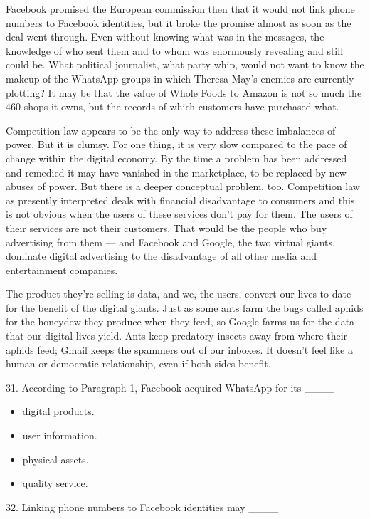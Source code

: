 \documentclass[UTF8,11pt]{ctexart}
\begin{document}
Facebook promised the European commission then that it would not link phone numbers to Facebook identities, but it broke the promise almost as soon as the deal went through. Even without knowing what was in the messages, the knowledge of who sent them and to whom was enormously revealing and still could be. What political journalist, what party whip, would not want to know the makeup of the WhatsApp groups in which Theresa May’s enemies are currently plotting? It may be that the value of Whole Foods to Amazon is not so much the 460 shops it owns, but the records of which customers have purchased what.


Competition law appears to be the only way to address these imbalances of power. But it is clumsy. For one thing, it is very slow compared to the pace of change within the digital economy. By the time a problem has been addressed and remedied it may have vanished in the marketplace, to be replaced by new abuses of power. But there is a deeper conceptual problem, too. Competition law as presently interpreted deals with financial disadvantage to consumers and this is not obvious when the users of these services don’t pay for them. The users of their services are not their customers. That would be the people who buy advertising from them — and Facebook and Google, the two virtual giants, dominate digital advertising to the disadvantage of all other media and entertainment companies.


The product they’re selling is data, and we, the users, convert our lives to date for the benefit of the digital giants. Just as some ants farm the bugs called aphids for the honeydew they produce when they feed, so Google farms us for the data that our digital lives yield. Ants keep predatory insects away from where their aphids feed; Gmail keeps the spammers out of our inboxes. It doesn’t feel like a human or democratic relationship, even if both sides benefit.


31. According to Paragraph 1, Facebook acquired WhatsApp for its \_\_\_\_


\begin{itemize}[leftmargin=2em,itemsep=.2em,topsep=.4em]\item[A.] digital products.
\item[B.] user information.
\item[C.] physical assets.
\item[D.] quality service.
\end{itemize}

32. Linking phone numbers to Facebook identities may \_\_\_\_
\end{document}
